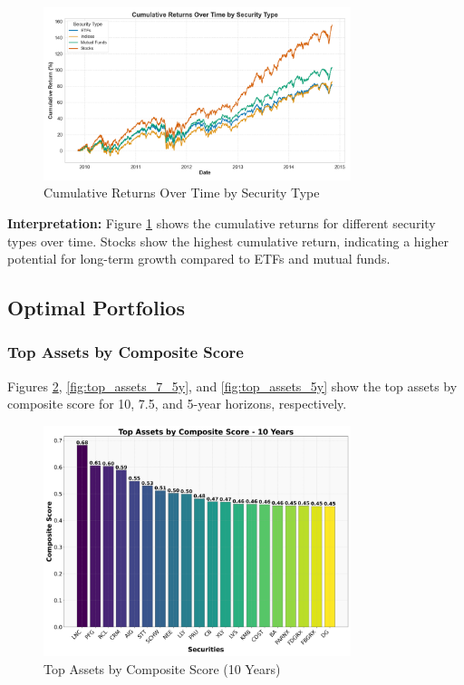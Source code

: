\begin{figure}[!htbp]
    \centering
    \includegraphics[width=0.8\textwidth]{../Figures/cumulative_returns_by_type.png}
    \caption{Cumulative Returns Over Time by Security Type}
    \label{fig:cumulative_returns_by_type}
\end{figure}

\textbf{Interpretation:} Figure \ref{fig:cumulative_returns_by_type} shows the cumulative returns for different security types over time. Stocks show the highest cumulative return, indicating a higher potential for long-term growth compared to ETFs and mutual funds.











\subsection{Optimal Portfolios}

\subsubsection{Top Assets by Composite Score}
Figures \ref{fig:top_assets_10y}, \ref{fig:top_assets_7_5y}, and \ref{fig:top_assets_5y} show the top assets by composite score for 10, 7.5, and 5-year horizons, respectively.

\begin{figure}[!htbp]
    \centering
    \includegraphics[width=0.8\textwidth]{../Figures/top_assets_composite_score_10_years.png}
    \caption{Top Assets by Composite Score (10 Years)}
    \label{fig:top_assets_10y}
\end{figure}

